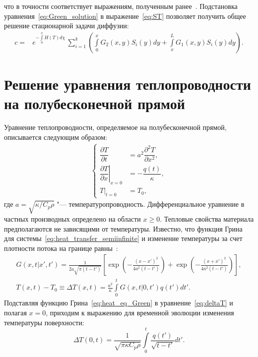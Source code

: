 что в точности соответствует выражениям, полученным ранее~\cite{Denis2022}. Подстановка уравнения~\eqref{eq:Green_solution} в выражение~\eqref{eq:ST} позволяет получить общее решение стационарной задачи диффузии:
\begin{align}
	c= & e^{-\int\limits_0^x H(T)d\chi}\,\sum\limits_{i=1}^k \left( \int\limits_0^x G_2(x,y)S_i(y)dy + \int\limits_x^L G_1(x,y)S_i(y)dy \right).\nonumber
\end{align}

\chapter{Решение уравнения теплопроводности на полубесконечной прямой}\label{app:E}

Уравнение теплопроводности, определяемое на полубесконечной прямой, описывается следующим образом:
\begin{align}
	\label{eq:heat_transfer_semiinfinite}
	\begin{cases}
		\dfrac{\partial T}{\partial t} & = a^2 \dfrac{\partial^2 T}{\partial x^2}, \\[5pt]
		\left.\dfrac{\partial T}{\partial x}\right\vert_{x=0}& = -\dfrac{q(t)}{\kappa},                \\[5pt]
        \left. T \right\vert_{t=0} & = T_0,
	\end{cases}
\end{align}
где \( a = \sqrt{\kappa/C_p\rho} \) "--- температуропроводность. Дифференциальное уравнение в частных производных определено на области \( x \geq 0 \). Тепловые свойства материала предполагаются не зависящими от температуры. Известно, что функция Грина для системы~\cref{eq:heat_transfer_semiinfinite} и изменение температуры за счет плотности потока на границе равны~\cite{Bechtel1975}:
\begin{subequations}
    \begin{gather}
        G(x,t|x',t') = \frac{1}{2a\sqrt{\pi(t-t')}} \left[ \exp \left( -\frac{(x-x')^2}{4a^2(t-t')} \right) + \exp \left( -\frac{(x+x')^2}{4a^2(t-t')} \right) \right],\label{eq:heat_eq_Green}\\
        T(x,t)-T_0 \equiv \Delta T(x,t) = \frac{a^2}{\kappa} \int\limits_0^t G(x,t|0,t')q(t')dt'. \label{eq:deltaT}
    \end{gather}
\end{subequations}
Подставляя функцию Грина~\cref{eq:heat_eq_Green} в уравнение~\cref{eq:deltaT} и полагая \(x=0\), приходим к выражению для временной эволюции изменения температуры поверхности:
\begin{equation}
    \Delta T(0,t) = \frac{1}{\sqrt{\pi\kappa C_p \rho}} \int\limits_0^t \frac{q(t')}{\sqrt{t-t'}}dt'.
\end{equation}


